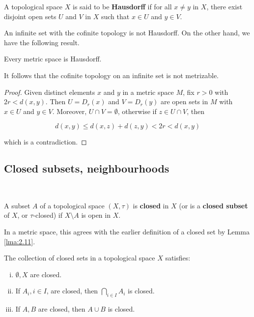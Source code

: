\documentclass[a4paper]{article}
\begin{document}
\begin{definition}
    A topological space $X$ is said to be \textbf{Hausdorff} if for all $x \neq y$ in $X$, there exist disjoint open sets $U$ and $V$ in $X$ such that $x \in U$ and $y \in V$.
\end{definition}

\begin{note}
    An infinite set with the cofinite topology is not Hausdorff. On the other hand, we have the following result.
\end{note}

\begin{proposition}
    Every metric space is Hausdorff.
\end{proposition}

It follows that the cofinite topology on an infinite set is not metrizable.
\begin{proof}
    Given distinct elements $x$ and $y$ in a metric space $M$, fix $r>0$ with $2 r<d(x, y)$. Then $U=D_{r}(x)$ and $V=D_{r}(y)$ are open sets in $M$ with $x \in U$ and $y \in V$. Moreover, $U \cap V=\emptyset$, otherwise if $z \in U \cap V$, then

$$
d(x, y) \leqslant d(x, z)+d(z, y)<2 r<d(x, y)
$$

which is a contradiction.
\end{proof}

\subsection{Closed subsets, neighbourhoods}
\ \vspace{-1.5em}
\begin{definition}
    A subset $A$ of a topological space $(X, \tau)$ is \textbf{closed} in $X$ (or is a \textbf{closed subset} of $X$, or $\tau$-closed) if $X \setminus A$ is open in $X$.
\end{definition}

In a metric space, this agrees with the earlier definition of a closed set by Lemma \ref{lma:2.11}.

\begin{proposition}
    The collection of closed sets in a topological space $X$ satisfies:

\begin{enumerate}[(i)]
    \item $\emptyset, X$ are closed.

    \item If $A_{i}, i \in I$, are closed, then $\bigcap_{i \in I} A_{i}$ is closed.
    
    \item If $A, B$ are closed, then $A \cup B$ is closed.
\end{enumerate}
\end{proposition}
\end{document}
